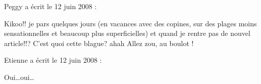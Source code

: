 \medskip
Peggy a écrit le 12 juin 2008 :
\begin{displayquote}
Kikoo!! je pars quelques jours (en vacances avec des copines, sur des plages moins sensationnelles et beaucoup plus superficielles) et quand je rentre pas de nouvel article!!?
C'est quoi cette blague? ahah
Allez zou, au boulot !
\end{displayquote}

\medskip
Etienne a écrit le 12 juin 2008 :
\begin{displayquote}
Oui\dots oui\dots
\end{displayquote}

\vfill
